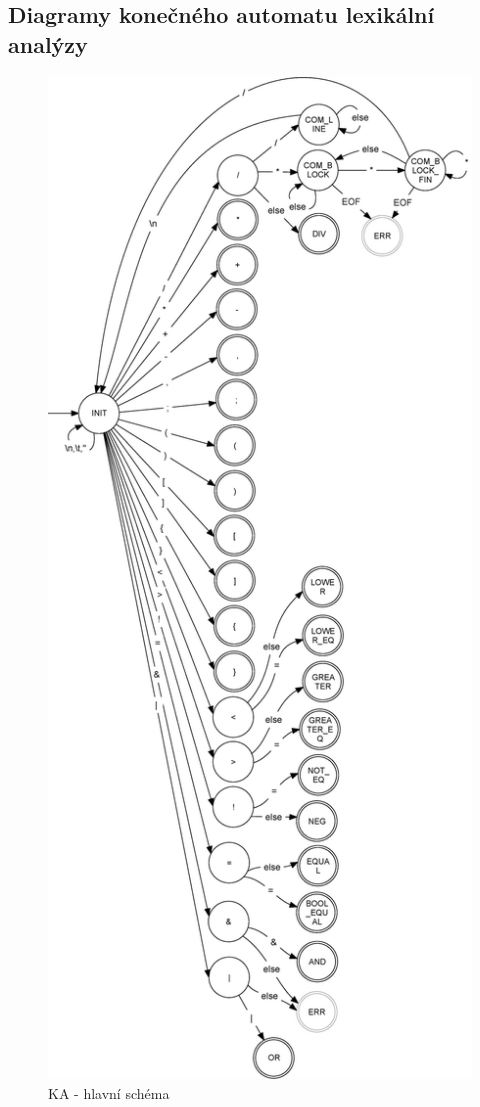 \documentclass[a4paper,11pt]{article}
\begin{document}
\subsection{Diagramy konečného automatu lexikální analýzy}
\label{diag:LA-FSM}
\begin{figure}[H]
	\centering
	\includegraphics[scale=.31]{FSM_MAIN.eps}
	\caption{KA - hlavní schéma}
\end{figure}
\end{document}
